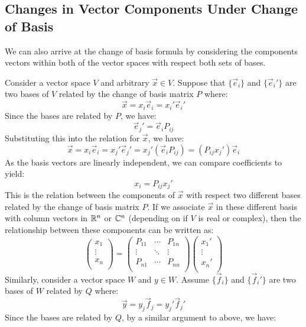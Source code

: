 \documentclass[../main.tex]{subfiles}
\begin{document}
\subsection{Changes in Vector Components Under Change of Basis}
We can also arrive at the change of basis formula by considering the components vectors within both of the vector spaces with respect both sets of bases.

Consider a vector space $V$ and arbitrary $\vec{x} \in V$.
Suppose that $\{\vec{e}_i\}$ and $\{\vec{e}_i'\}$ are two bases of $V$ related by the change of basis matrix $P$ where:
\[
  \vec{x} = x_i \vec{e}_i = x_i' \vec{e}_i'
\]
Since the bases are related by $P$, we have:
\[
  \vec{e}_j' = \vec{e}_i P_{i j}
\]
Substituting this into the relation for $\vec{x}$, we have:
\[
  \vec{x} = x_i \vec{e}_i = x_j' \vec{e}_j' = x_j'(\vec{e}_i P_{i j}) = (P_{i j}x_j')\vec{e}_i
\]
As the basis vectors are linearly independent, we can compare coefficients to yield:
\begin{equation}
  x_i = P_{i j}x_j' \label{vectorComponentsCOB}
\end{equation}
This is the relation between the components of $\vec{x}$ with respect two different bases related by the change of basis matrix $P$.
If we associate $\vec{x}$ in these different basis with column vectors in $\mathbb{R}^{n}$ or $\mathbb{C}^{n}$ (depending on if $V$ is real or complex), then the relationship between these components can be written as:
\[
  \begin{pmatrix}
  x_1 \\
  \vdots \\
  x_n \\
  \end{pmatrix}=
  \begin{pmatrix}
  P_{1 1} & \cdots & P_{1 n} \\
  \vdots & \ddots & \vdots \\
  P_{n 1} & \cdots & P_{n n} \\
  \end{pmatrix}
  \begin{pmatrix}
  x_1' \\
  \vdots \\
  x_n' \\
  \end{pmatrix}
\]
Similarly, consider a vector space $W$ and $y \in W$.
Assume $\{\vec{f}_i\}$ and $\{\vec{f}_i'\}$ are two bases of $W$ related by $Q$ where:
\[
  \vec{y} = y_j \vec{f}_j = y_j'\vec{f}_j'
\]
Since the bases are related by $Q$, by a similar argument to above, we have:
\end{document}

